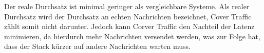 Der reale Durchsatz ist minimal geringer als vergleichbare Systeme. Als realer Durchsatz wird der Durchsatz an echten Nachrichten bezeichnet, Cover Traffic zählt somit nicht darunter. Jedoch kann Corver Traffic den Nachteil der Latenz minimieren, da hierdurch mehr Nachrichten versendet werden, was zur Folge hat, dass der Stack kürzer auf andere Nachrichten warten muss.
